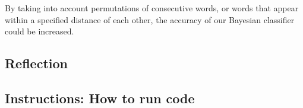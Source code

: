 \documentclass[10pt, a4paper]{article}
\begin{document}
By taking into account permutations of consecutive words, or words that appear within a specified distance of each other, the accuracy of our Bayesian classifier could be increased. 

\subsection*{Reflection}

\subsection*{Instructions: How to run code}
\end{document}
